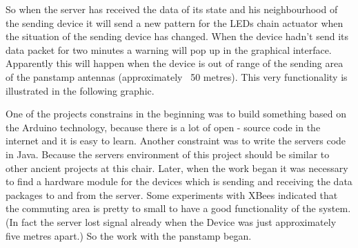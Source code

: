 So when the server has received the data of its state and his neighbourhood of the sending device it will send a new pattern for the LEDs chain actuator when the situation of the sending device has changed.
When the device hadn't send its data packet for two minutes a warning will pop up in the graphical interface. Apparently this will happen when the device is out of range of the sending area of the panstamp antennas (approximately ~50 metres).
This very functionality is illustrated in the following graphic.
 
One of the projects constrains in the beginning was to build something based on the Arduino technology, because there is a lot of open - source code in the internet and it is easy to learn.
Another constraint was to write the servers code in Java. Because the servers environment of this project should be similar to other ancient projects at this chair.
Later, when the work began it was necessary to find a hardware module for the devices which is sending and receiving the data packages to and from the server. Some experiments with XBees indicated that the commuting area is pretty to small to have a good functionality of the system. (In fact the server lost signal already when the Device was just approximately five metres apart.) So the work with the panstamp began.   
 

